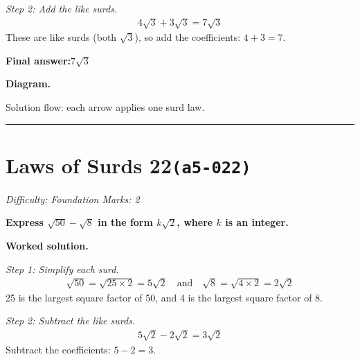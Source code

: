 \documentclass[11pt]{article}
\newcommand{\question}[1]{\par\medskip\noindent\textbf{#1}\par}
\begin{document}
\textit{Step 2: Add the like surds.}
\[\begin{gathered}
4\sqrt{3} + 3\sqrt{3} = 7\sqrt{3}
\end{gathered}\]
These are like surds (both \( \sqrt{3} \)), so add the coefficients: \( 4 + 3 = 7 \).

\begin{answerbox}
\textbf{Final answer:}\quad \(\displaystyle 7\sqrt{3}\)
\end{answerbox}
\textbf{Diagram.}

\begin{center}
\end{center}
\small Solution flow: each arrow applies one surd law.\normalsize

\medskip\hrule

\section*{Laws of Surds 22\quad\small\texttt{(a5-022)}}
\textit{Difficulty: Foundation \quad\textbar\quad Marks: 2}

\question{Express \( \sqrt{50} - \sqrt{8} \) in the form \( k\sqrt{2} \), where \( k \) is an integer.}

\textbf{Worked solution.}

\textit{Step 1: Simplify each surd.}
\[\begin{gathered}
\sqrt{50} = \sqrt{25 \times 2} = 5\sqrt{2} \quad \text{and} \quad \sqrt{8} = \sqrt{4 \times 2} = 2\sqrt{2}
\end{gathered}\]
25 is the largest square factor of 50, and 4 is the largest square factor of 8.

\textit{Step 2: Subtract the like surds.}
\[\begin{gathered}
5\sqrt{2} - 2\sqrt{2} = 3\sqrt{2}
\end{gathered}\]
Subtract the coefficients: \( 5 - 2 = 3 \).
\end{document}
